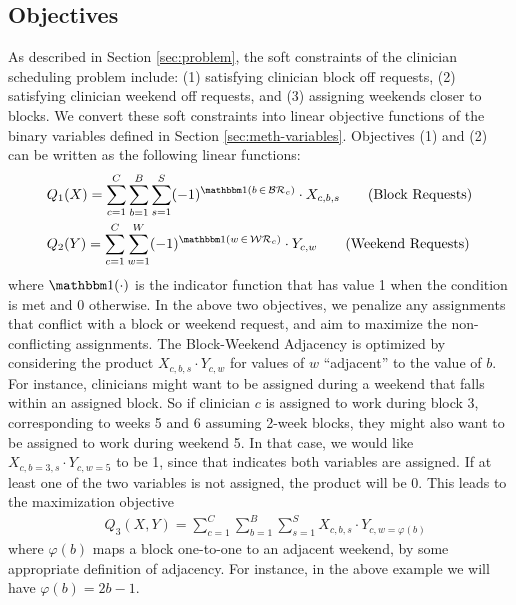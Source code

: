 \subsection{Objectives} \label{sec:meth-objectives}
As described in Section \ref{sec:problem}, the soft constraints of the clinician scheduling problem include: (1) satisfying clinician block off requests, (2) satisfying clinician weekend off requests, and (3) assigning weekends closer to blocks. We convert these soft constraints into linear objective functions of the binary variables defined in Section \ref{sec:meth-variables}. Objectives (1) and (2) can be written as the following linear functions:  %
\begin{align}
	&Q_1(X) = \sum_{c=1}^{C} \sum_{b=1}^{B} \sum_{s=1}^{S} (-1)^{\ind(b\,\in\,\mathcal{BR}_c)}\cdot X_{c, b, s} \tag{Block Requests} \label{eqn:obj-block-requests}\\
	&Q_2(Y) = \sum_{c=1}^{C} \sum_{w=1}^{W} (-1)^{\ind(w\,\in\,\mathcal{WR}_c)}\cdot Y_{c, w} \tag{Weekend Requests} \label{eqn:obj-weekend-requests}
\end{align}
where $\ind(\cdot)$ is the indicator function that has value 1 when the condition is met and 0 otherwise. In the above two objectives, we penalize any assignments that conflict with a block or weekend request, and aim to maximize the non-conflicting assignments. The Block-Weekend Adjacency is optimized by considering the product $X_{c, b, s}\cdot Y_{c, w}$ for values of $w$ ``adjacent'' to the value of $b$. For instance, clinicians might want to be assigned during a weekend that falls within an assigned block. So if clinician $c$ is assigned to work during block 3, corresponding to weeks 5 and 6 assuming 2-week blocks, they might also want to be assigned to work during weekend 5. In that case, we would like $X_{c, b=3, s} \cdot Y_{c, w=5}$ to be 1, since that indicates both variables are assigned. If at least one of the two variables is not assigned, the product will be 0. This leads to the maximization objective  %
\begin{align}
	&Q_3(X, Y) = \sum_{c=1}^{C} \sum_{b=1}^{B} \sum_{s=1}^{S} X_{c, b, s}\cdot Y_{c, w=\varphi(b)} \tag{Block-Weekend Adjacency} \label{eqn:obj-block-weekend-adj}
\end{align}
where $\varphi(b)$ maps a block one-to-one to an adjacent weekend, by some appropriate definition of adjacency. For instance, in the above example we will have $\varphi(b) = 2b - 1$. \\

